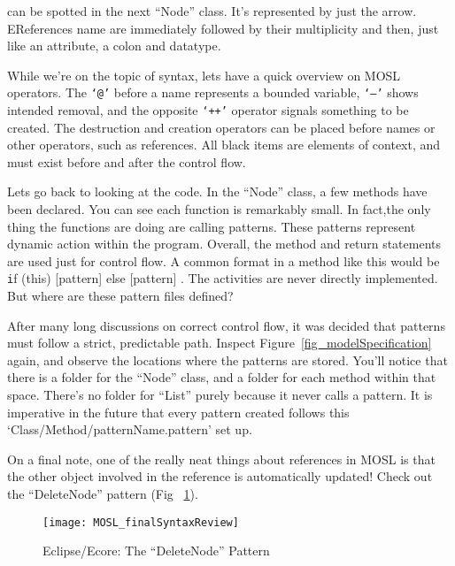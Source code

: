 \newpage
\texHeader

can be spotted in the next ``Node'' class. It's represented by just the arrow. EReferences name are immediately followed by their multiplicity %
and then, just like an attribute, a colon and datatype.

While we're on the topic of syntax, lets have a quick overview on MOSL operators. The \texttt{`@'} before a name represents a bounded variable, \texttt{`--'} shows intended removal, and the opposite \texttt{`++'} operator signals something to be created. The destruction and creation operators can be placed before names or other operators, such as references.  All black items are elements of context, and must exist before and after the control flow. 

Lets go back to looking at the code. In the ``Node'' class, a few methods have been declared. You can see each function is remarkably small. In fact,the only thing the functions are doing are calling patterns. These patterns represent dynamic action within the program. Overall, the method and return statements are used just for control flow. A common format in a method like this would be {\texttt if (this) [pattern] else [pattern] }. The activities are never directly implemented. But where are these pattern files defined?

After many long discussions on correct control flow, it was decided that patterns must follow a strict, predictable path. Inspect Figure~\ref{fig_modelSpecification} again, and observe the locations where the patterns are stored. You'll notice that there is a folder for the ``Node'' class, and a folder for each method within that space. There's no folder for ``List'' purely because it never calls a pattern. It is imperative in the future that every pattern created follows this `Class/Method/patternName.pattern' set up. %

On a final note, one of the really neat things about references in MOSL is that the other object involved in the reference is automatically updated! Check out the ``DeleteNode'' pattern (Fig ~\ref{fig_MOSLOverview}). 

 \begin{figure}[htbp]
  \centering
  \texttt{[image: MOSL\_finalSyntaxReview]}
  \caption{Eclipse/Ecore: The ``DeleteNode'' Pattern}
  \label{fig_MOSLOverview}
\end{figure}

